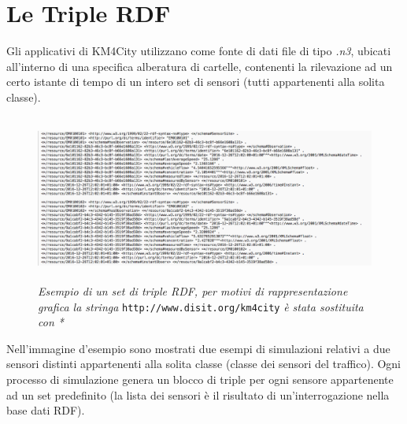\documentclass[12pt,a4paper,italian]{article}
\begin{document}
\section{Le Triple RDF}
Gli applicativi di KM4City utilizzano come fonte di dati file di tipo \emph{.n3}, ubicati all'interno di una specifica alberatura di cartelle, 
contenenti la rilevazione ad un certo istante di tempo di un intero set di sensori (tutti appartenenti alla solita classe).

\begin{figure}[!h]
	\centering
	\includegraphics[height=5.5cm]{img/triplerdf2.png}
\caption{\emph{Esempio di un set di triple RDF, per motivi di rappresentazione grafica la stringa} \texttt{http://www.disit.org/km4city} \emph{è stata sostituita con * }}
\end{figure}

Nell'immagine d'esempio sono mostrati due esempi di simulazioni relativi a due sensori distinti appartenenti alla solita classe (classe dei sensori del traffico). 
Ogni processo di simulazione genera un blocco di triple per ogni sensore appartenente ad un set predefinito (la lista dei sensori è il
risultato di un'interrogazione nella base dati RDF).
\end{document}
